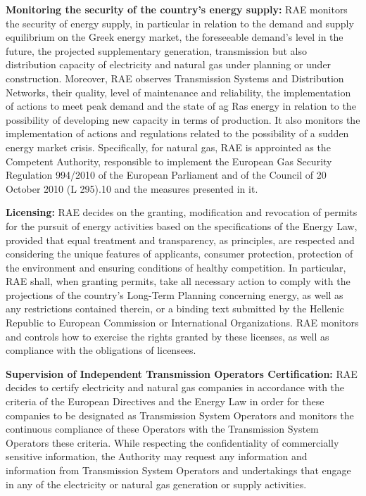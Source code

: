 \begin{itemize}
{\item{\textbf{Monitoring the security of the country's energy supply:}}
RAE monitors the security of energy supply, in particular in relation to the demand and supply equilibrium on the Greek energy market, the foreseeable demand’s level in the future, the projected supplementary generation, transmission but also distribution capacity of electricity and natural gas under planning or under construction. Moreover, RAE observes Transmission Systems and Distribution Networks, their quality, level of maintenance and reliability, the implementation of actions to meet peak demand and the state of ag Ras energy in relation to the possibility of developing new capacity in terms of production. It also monitors the implementation of actions and regulations related to the possibility of a sudden energy market crisis. Specifically, for natural gas, RAE is approinted as the Competent Authority, responsible to implement the European Gas Security Regulation 994/2010 of the European Parliament and of the Council of 20 October 2010 (L 295).10 and the measures presented in it.  
\item{\textbf{Licensing:}}
RAE decides on the granting, modification and revocation of permits for the pursuit of energy activities based on the specifications of the Energy Law, provided that equal treatment and transparency, as principles, are respected and considering the unique features of applicants, consumer protection, protection of the environment and ensuring conditions of healthy competition. In particular, RAE shall, when granting permits, take all necessary action to comply with the projections of the country’s Long-Term Planning concerning energy, as well as any restrictions contained therein, or a binding text submitted by the Hellenic Republic to European Commission or International Organizations. RAE monitors and controls how to exercise the rights granted by these licenses, as well as compliance with the obligations of licensees.
\item{\textbf{Supervision of Independent Transmission Operators Certification:}}
RAE decides to certify electricity and natural gas companies in accordance with the criteria of the European Directives and the Energy Law in order for these companies to be designated as Transmission System Operators and monitors the continuous compliance of these Operators with the Transmission System Operators these criteria. While respecting the confidentiality of commercially sensitive information, the Authority may request any information and information from Transmission System Operators and undertakings that engage in any of the electricity or natural gas generation or supply activities.
}
\end{itemize}
